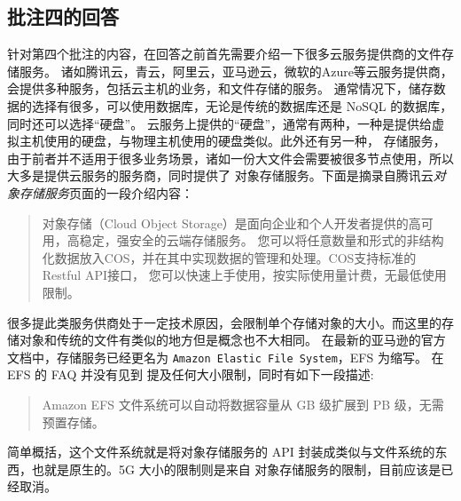 
\subsection{批注四的回答}
\label{sec:fix:bl4}

针对第四个批注的内容，在回答之前首先需要介绍一下很多云服务提供商的文件存储服务。
诸如腾讯云，青云，阿里云，亚马逊云，微软的Azure等云服务提供商，会提供多种服务，包括云主机的业务，和文件存储的服务。
通常情况下，储存数据的选择有很多，可以使用数据库，无论是传统的数据库还是 NoSQL 的数据库，同时还可以选择“硬盘”。
云服务上提供的“硬盘”，通常有两种，一种是提供给虚拟主机使用的硬盘，与物理主机使用的硬盘类似。此外还有另一种，
存储服务，由于前者并不适用于很多业务场景，诸如一份大文件会需要被很多节点使用，所以大多是提供云服务的服务商，同时提供了
对象存储服务。下面是摘录自腾讯云\textit{对象存储服务}页面的一段介绍内容：
\begin{quote}
    对象存储（Cloud Object Storage）是面向企业和个人开发者提供的高可用，高稳定，强安全的云端存储服务。
    您可以将任意数量和形式的非结构化数据放入COS，并在其中实现数据的管理和处理。COS支持标准的Restful API接口，
    您可以快速上手使用，按实际使用量计费，无最低使用限制。
\end{quote}
很多提此类服务供商处于一定技术原因，会限制单个存储对象的大小。而这里的存储对象和传统的文件有类似的地方但是概念也不大相同。
在最新的亚马逊的官方文档中，存储服务已经更名为 \verb|Amazon Elastic File System|，EFS 为缩写。 在 EFS 的 FAQ 并没有见到
提及任何大小限制，同时有如下一段描述:
\begin{quote}
    Amazon EFS 文件系统可以自动将数据容量从 GB 级扩展到 PB 级，无需预置存储。
\end{quote}

简单概括，这个文件系统就是将对象存储服务的 API 封装成类似与文件系统的东西，也就是原生的。5G 大小的限制则是来自
对象存储服务的限制，目前应该是已经取消。